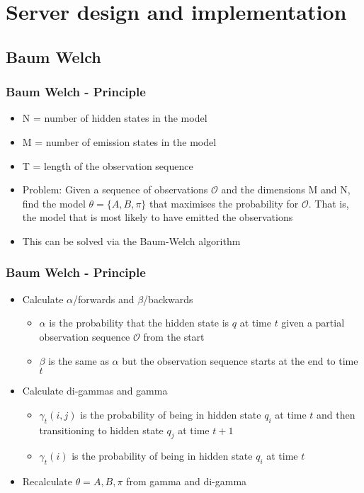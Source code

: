 \section{Server design and implementation}
\subsection{Baum Welch}
\begin{frame}
	\frametitle{Baum Welch - Principle}
	\begin{itemize}
		\item N = number of hidden states in the model
		\item M = number of emission states in the model
		\item T = length of the observation sequence
		\item Problem: Given a sequence of observations $\mathcal{O}$ and the dimensions M and N, find the model $\theta = \{A, B, \pi\}$ that maximises the probability for $\mathcal{O}$. That is, the model that is most likely to have emitted the observations
		\item This can be solved via the Baum-Welch algorithm
	\end{itemize}
\end{frame}

\begin{frame}
	\frametitle{Baum Welch - Principle}
	\begin{itemize}
		\item Calculate $\alpha$/forwards and $\beta$/backwards
		\begin{itemize}
			\item $\alpha$ is the probability that the hidden state is $q$ at time $t$ given a partial observation sequence $\mathcal{O}$ from the start
			\item $\beta$ is the same as $\alpha$ but the observation sequence starts at the end to time $t$
		\end{itemize}
		\item Calculate di-gammas and gamma
		\begin{itemize}
			\item $\gamma_t(i,j)$ is the probability of being in hidden state $q_i$ at time $t$ and then transitioning to hidden state $q_j$ at time $t+1$
			\item $\gamma_t(i)$ is the probability of being in hidden state $q_i$ at time $t$
		\end{itemize}
		\item Recalculate $\theta = {A,B,\pi}$ from gamma and di-gamma
	\end{itemize}
\end{frame}

